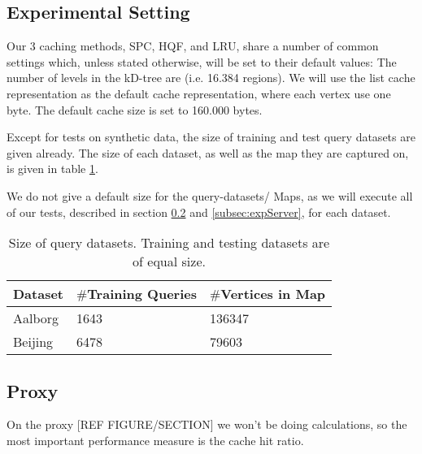 \subsection{Experimental Setting}

% 

Our 3 caching methods, SPC, HQF, and LRU, share a number of common settings which, unless stated otherwise, will be set to their default values: 
The number of levels in the kD-tree are (i.e. 16.384 regions). We will use the list cache representation as the default cache representation, where each vertex use one byte. The default cache size is set to 160.000 bytes.

Except for tests on synthetic data, the size of training and test query datasets are given already. The size of each dataset, as well as the map they are captured on, is given in table \ref{tab:datasetsize}.

We do not give a default size for the query-datasets/ Maps, as we will execute all of our tests, described in section \ref{subsec:expProxy} and \ref{subsec:expServer}, for each dataset.


\begin{table}
\center
\begin{tabular}{|l|l|l|}\hline
Dataset & $\#$Training Queries & $\#$Vertices in Map \\\hline
Aalborg & 1643 & 136347 \\\hline
Beijing & 6478 & 79603 \\\hline
\end{tabular}
\caption{Size of query datasets. Training and testing datasets are of equal size.}
\label{tab:datasetsize}
\end{table}


\subsection{Proxy}\label{subsec:expProxy}

On the proxy [REF FIGURE/SECTION] we won't be doing \spath calculations, so the most important performance measure is the cache hit ratio.

